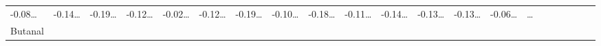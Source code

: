 \documentclass[
]{article}
\begin{document}
\begin{longtable}[]{@{}lllllllllllllllllllll@{}}
\begin{minipage}[t]{0.03\columnwidth}
-0.08\ldots{}\strut
\end{minipage} & \begin{minipage}[t]{0.03\columnwidth}\raggedright
-0.14\ldots{}\strut
\end{minipage} & \begin{minipage}[t]{0.03\columnwidth}\raggedright
-0.19\ldots{}\strut
\end{minipage} & \begin{minipage}[t]{0.03\columnwidth}\raggedright
-0.12\ldots{}\strut
\end{minipage} & \begin{minipage}[t]{0.03\columnwidth}\raggedright
-0.02\ldots{}\strut
\end{minipage} & \begin{minipage}[t]{0.03\columnwidth}\raggedright
-0.12\ldots{}\strut
\end{minipage} & \begin{minipage}[t]{0.03\columnwidth}\raggedright
-0.19\ldots{}\strut
\end{minipage} & \begin{minipage}[t]{0.03\columnwidth}\raggedright
-0.10\ldots{}\strut
\end{minipage} & \begin{minipage}[t]{0.03\columnwidth}\raggedright
-0.18\ldots{}\strut
\end{minipage} & \begin{minipage}[t]{0.03\columnwidth}\raggedright
-0.11\ldots{}\strut
\end{minipage} & \begin{minipage}[t]{0.03\columnwidth}\raggedright
-0.14\ldots{}\strut
\end{minipage} & \begin{minipage}[t]{0.03\columnwidth}\raggedright
-0.13\ldots{}\strut
\end{minipage} & \begin{minipage}[t]{0.03\columnwidth}\raggedright
-0.13\ldots{}\strut
\end{minipage} & \begin{minipage}[t]{0.03\columnwidth}\raggedright
-0.06\ldots{}\strut
\end{minipage} & \begin{minipage}[t]{0.01\columnwidth}\raggedright
\ldots{}\strut
\end{minipage}\tabularnewline
\begin{minipage}[t]{0.03\columnwidth}\raggedright
Butanal\strut
\end{minipage} & \begin{minipage}[t]{0.03\columnwidth}\raggedright

\end{minipage}
\end{longtable}
\end{document}
